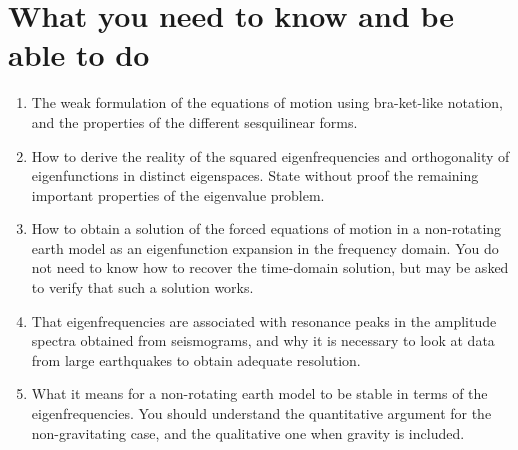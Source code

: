\section*{What you need to know and be able to do}
\begin{enumerate}
    \item[(i)] The weak formulation of the equations of motion using bra-ket-like notation, and the properties of the different sesquilinear forms.
    \item[(ii)] How to derive the reality of the squared eigenfrequencies and orthogonality of eigenfunctions in distinct eigenspaces. State without proof the remaining important properties of the eigenvalue problem.
    \item[(iii)] How to obtain a solution of the forced equations of motion in a non-rotating earth model as an eigenfunction expansion in the frequency domain. You do not need to know how to recover the time-domain solution, but may be asked to verify that such a solution works.
    \item[(iv)] That eigenfrequencies are associated with resonance peaks in the amplitude spectra obtained from seismograms, and why it is necessary to look at data from large earthquakes to obtain adequate resolution.
    \item[(v)] What it means for a non-rotating earth model to be stable in terms of the eigenfrequencies. You should understand the quantitative argument for the non-gravitating case, and the qualitative one when gravity is included.
\end{enumerate}
